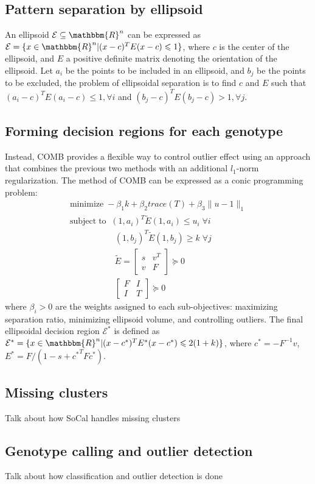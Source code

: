 \documentclass{scrartcl}
\begin{document}
\subsection{Pattern separation by ellipsoid}

An ellipsoid $\mathcal{E} \subseteq \mathbbm{R}^{n}$ can be expressed as
$\mathcal{E} = \{x \in \mathbbm{R}^{n} | (x-c)^TE(x-c)\leqslant1\}$, where
$c$ is the center of the ellipsoid, and $E$ a positive definite matrix
denoting the orientation of the ellipsoid.
Let $a_i$ be the points to be included in an ellipsoid, and $b_j$
be the points to be excluded, the problem of ellipsoidal separation is to find
$c$ and $E$ such that $(a_i-c)^TE(a_i-c)\leqslant1, \forall i$ and
$(b_j-c)^TE(b_j-c)>1, \forall j$.

\subsection{Forming decision regions for each genotype}

Instead, COMB provides a flexible way to control outlier effect using an
approach that combines the previous two methods with an additional $l_1$-norm
regularization.
The method of COMB can be expressed as a conic programming problem:
\begin{gather*}
    \mathrm{minimize}\;-{\beta_{1}}k+{\beta_{2}} trace(T)+\beta_{3} \|u-1\|_1 \\  
    \mathrm{subject\;to}\;\;
    (1,a_i)^T\tilde{E}(1,a_i)\leqslant u_i \; \forall i \\
    \;\;\;\;\;\;\;\;\;\;\;\;\;\;\;\;\;\;\;
    (1,b_j)^T\tilde{E}(1,b_j) \ge k \; \forall j \\
    \;\;\;\;\;\;\;\;\;\;\;\;\;\;\;\;\;\;\;
    \tilde{E}=
    \left[
        \begin{array}{cc}
            s & v^T \\
            v & F
        \end{array}
    \right] \succeq 0 \\
    \;\;\;\;\;\;\;\;\;\;\;\;\;\;\;\;\;\;\;
    \left[
        \begin{array}{cc}
            F & I \\
            I & T
        \end{array}
    \right] \succeq 0
\end{gather*}
where $\beta_{i} > 0$ are the weights assigned to each sub-objectives:
maximizing separation ratio, minimizing ellipsoid volume, and controlling
outliers.
The final ellipsoidal decision region $\mathcal{E}^{*}$ is defined as
$\mathcal{E}^{*}=
\{x \in \mathbbm{R}^{n} | (x-c^{*})^TE^{*}(x-c^{*})\leqslant2(1+k)\}$,
where
$c^{*}=-F^{-1}v$, $E^{*}=F/(1-s+{c^{*}}^TF{c^{*}})$.

\subsection{Missing clusters}
Talk about how SoCal handles missing clusters

\subsection{Genotype calling and outlier detection}
Talk about how classification and outlier detection is done

\end{document}
